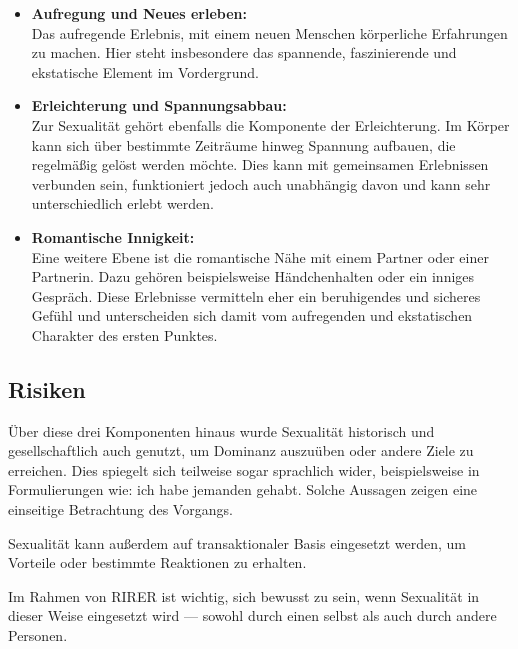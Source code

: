 \begin{itemize}
    \item \textbf{Aufregung und Neues erleben:} \\
    Das aufregende Erlebnis, mit einem neuen Menschen körperliche Erfahrungen zu machen. Hier steht insbesondere das spannende, faszinierende und ekstatische Element im Vordergrund.

    \item \textbf{Erleichterung und Spannungsabbau:} \\
    Zur Sexualität gehört ebenfalls die Komponente der Erleichterung. Im Körper kann sich über bestimmte Zeiträume hinweg Spannung aufbauen, die regelmäßig gelöst werden möchte. Dies kann mit gemeinsamen Erlebnissen verbunden sein, funktioniert jedoch auch unabhängig davon und kann sehr unterschiedlich erlebt werden.

    \item \textbf{Romantische Innigkeit:} \\
    Eine weitere Ebene ist die romantische Nähe mit einem Partner oder einer Partnerin. Dazu gehören beispielsweise Händchenhalten oder ein inniges Gespräch. Diese Erlebnisse vermitteln eher ein beruhigendes und sicheres Gefühl und unterscheiden sich damit vom aufregenden und ekstatischen Charakter des ersten Punktes.
\end{itemize}

\subsection{Risiken}

Über diese drei Komponenten hinaus wurde Sexualität historisch und gesellschaftlich auch genutzt, um Dominanz auszuüben oder andere Ziele zu erreichen. Dies spiegelt sich teilweise sogar sprachlich wider, beispielsweise in Formulierungen wie: \glqq ich habe jemanden gehabt\grqq. Solche Aussagen zeigen eine einseitige Betrachtung des Vorgangs.

Sexualität kann außerdem auf transaktionaler Basis eingesetzt werden, um Vorteile oder bestimmte Reaktionen zu erhalten.

Im Rahmen von RIRER ist wichtig, sich bewusst zu sein, wenn Sexualität in dieser Weise eingesetzt wird --- sowohl durch einen selbst als auch durch andere Personen.

